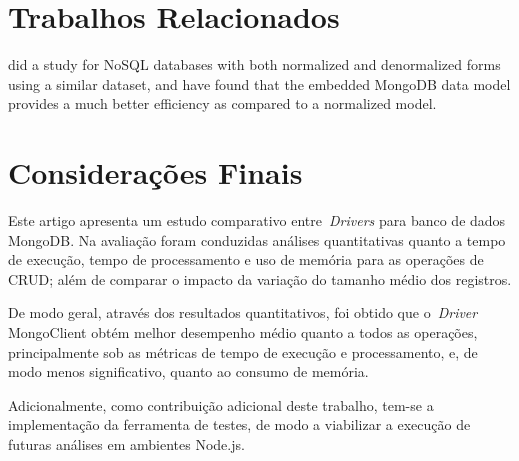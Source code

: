 \documentclass[12pt]{article}
\begin{document}



\section{Trabalhos Relacionados} 
\label{section:relacionados}

\cite{kanade2014study} did a study for NoSQL databases with both normalized and denormalized forms using a similar dataset, and have found that the embedded MongoDB
data model provides a much better efficiency as compared to a normalized model. 


\section{Considerações Finais}
\label{section:consideracoes}

Este artigo apresenta um estudo comparativo entre~\emph{Drivers} para banco de dados MongoDB.
Na avaliação foram conduzidas análises quantitativas quanto a tempo de execução, tempo de processamento e uso de memória para as operações de CRUD; além de comparar o impacto da variação do tamanho médio dos registros.

De modo geral, através dos resultados quantitativos, foi obtido que o~\emph{Driver} MongoClient obtém melhor desempenho médio quanto a todos as operações, principalmente sob as métricas de tempo de execução e processamento, e, de modo menos significativo, quanto ao consumo de memória.

Adicionalmente, como contribuição adicional deste trabalho, tem-se a implementação da ferramenta de testes, de modo a viabilizar a execução de futuras análises em ambientes Node.js.




\end{document}
